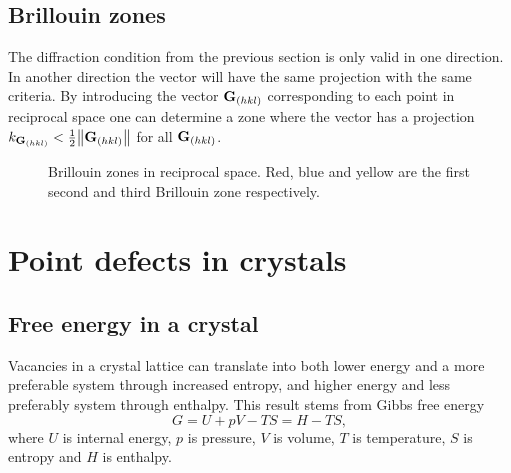 \documentclass[10pt, a4paper]{amsart}
\begin{document}
\subsection{Brillouin zones}
The diffraction condition from the previous section is only valid in one direction. In another direction the vector will have the same projection with the same criteria. By introducing the vector $\vb{G}_{(hkl)}$ corresponding to each point in reciprocal space one can determine a zone where the vector has a projection $k_{\vb{G}_{(hkl)}} < \frac{1}{2}\norm{\vb{G}_{(hkl)}}$ for all $\vb{G}_{(hkl)}$.

\begin{figure}[ht]
	\centering
	\caption{Brillouin zones in reciprocal space. Red, blue and yellow are the first second and third Brillouin zone respectively.}
	\label{fig:brillouin}	
\end{figure}

\section{Point defects in crystals}

\subsection{Free energy in a crystal}

Vacancies in a crystal lattice can translate into both lower energy and a more preferable system through increased entropy, and higher energy and less preferably system through enthalpy. This result stems from Gibbs free energy
\begin{equation}
G = U + pV - TS = H - TS,
\end{equation}
where $U$ is internal energy, $p$ is pressure, $V$ is volume, $T$ is temperature, $S$ is entropy and $H$ is enthalpy.
\end{document}
